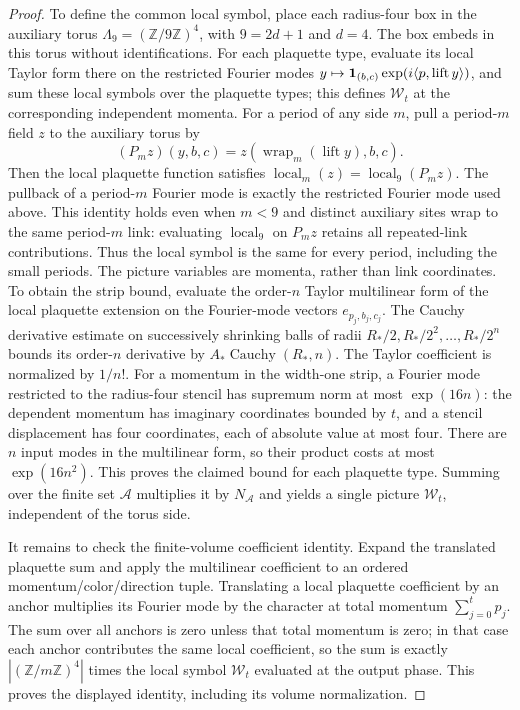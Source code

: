 \begin{proof}
To define the common local symbol, place each radius-four box in the auxiliary
torus $\Lambda_9=(\mathbb Z/9\mathbb Z)^4$, with $9=2d+1$ and $d=4$. The
box embeds in this torus without identifications. For each plaquette type,
evaluate its local Taylor form there on the restricted Fourier modes
$y\mapsto {\bf1}_{(b,c)}\exp(i\langle p,\operatorname{lift}y\rangle)$,
and sum these local symbols over the plaquette types; this defines
$\mathcal W_t$ at the corresponding independent momenta. For a period of any
side $m$, pull a period-$m$ field $z$ to the auxiliary torus by
\[
 (P_mz)(y,b,c)=z(\operatorname{wrap}_m(\operatorname{lift}y),b,c).
\]
Then the local plaquette function satisfies
$\operatorname{local}_m(z)=\operatorname{local}_9(P_mz)$. The pullback of a
period-$m$ Fourier mode is exactly the restricted Fourier mode used above.
This identity holds even when $m<9$ and distinct auxiliary sites wrap to the
same period-$m$ link: evaluating $\operatorname{local}_9$ on $P_mz$ retains
all repeated-link contributions. Thus the local symbol is the same for every
period, including the small periods.
The picture variables are momenta, rather than link coordinates. To obtain
the strip bound, evaluate the order-$n$ Taylor multilinear form of the local
plaquette extension on the Fourier-mode vectors $e_{p_j,b_j,c_j}$. The Cauchy
derivative estimate on successively shrinking balls of radii $R_*/2,R_*/2^2,\ldots,R_*/2^n$ bounds its order-$n$
derivative by $A_*\operatorname{Cauchy}(R_*,n)$. The Taylor coefficient is
normalized by $1/n!$.
For a momentum in the width-one strip, a Fourier mode restricted to the
radius-four stencil has supremum norm at most $\exp(16n)$: the dependent momentum has imaginary coordinates
bounded by $t$, and a stencil displacement has four coordinates, each of
absolute value at most four. There are $n$ input modes in the multilinear form, so their
product costs at most $\exp(16n^2)$. This proves the claimed bound for each
plaquette type. Summing over the finite set $\mathcal A$ multiplies it by
$N_{\mathcal A}$ and yields a single picture $\mathcal W_t$, independent of
the torus side.

It remains to check the finite-volume coefficient identity. Expand the
translated plaquette sum and apply the multilinear coefficient to an ordered
momentum/color/direction tuple. Translating a local plaquette coefficient
by an anchor multiplies its Fourier mode by the character at total momentum
$\sum_{j=0}^t p_j$. The sum over all anchors is zero unless that total momentum is
zero; in that case each anchor contributes the same local coefficient, so
the sum is exactly $|(\mathbb Z/m\mathbb Z)^4|$ times the local symbol
$\mathcal W_t$ evaluated at the output phase. This proves the displayed
identity, including its volume normalization.
\end{proof}

